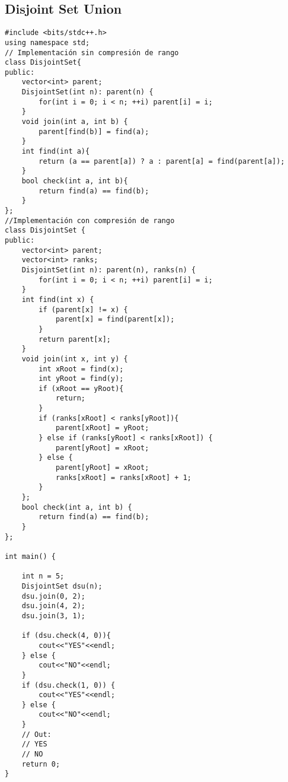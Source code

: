 \documentclass[10pt,letterpaper,twocolumn,twosided]{article}
\begin{document}
\subsection{Disjoint Set Union}
\begin{lstlisting}
#include <bits/stdc++.h>
using namespace std;
// Implementación sin compresión de rango
class DisjointSet{
public:
    vector<int> parent;
    DisjointSet(int n): parent(n) {
        for(int i = 0; i < n; ++i) parent[i] = i;
    }
    void join(int a, int b) {
        parent[find(b)] = find(a);
    }
    int find(int a){
        return (a == parent[a]) ? a : parent[a] = find(parent[a]); 
    }
    bool check(int a, int b){
        return find(a) == find(b);
    }
};
//Implementación con compresión de rango
class DisjointSet {
public:
    vector<int> parent;
    vector<int> ranks;
    DisjointSet(int n): parent(n), ranks(n) {
        for(int i = 0; i < n; ++i) parent[i] = i;
    }
    int find(int x) { 
        if (parent[x] != x) { 
            parent[x] = find(parent[x]); 
        } 
        return parent[x]; 
    }
    void join(int x, int y) { 
        int xRoot = find(x);
        int yRoot = find(y); 
        if (xRoot == yRoot){ 
            return; 
        }
        if (ranks[xRoot] < ranks[yRoot]){ 
            parent[xRoot] = yRoot; 
        } else if (ranks[yRoot] < ranks[xRoot]) {
            parent[yRoot] = xRoot; 
        } else { 
            parent[yRoot] = xRoot; 
            ranks[xRoot] = ranks[xRoot] + 1; 
        } 
    };
    bool check(int a, int b) {
        return find(a) == find(b);
    }
};

int main() {

    int n = 5;
    DisjointSet dsu(n);
    dsu.join(0, 2); 
    dsu.join(4, 2); 
    dsu.join(3, 1); 
    
    if (dsu.check(4, 0)){
        cout<<"YES"<<endl;
    } else {
        cout<<"NO"<<endl;
    } 
    if (dsu.check(1, 0)) {
        cout<<"YES"<<endl;
    } else {
        cout<<"NO"<<endl;
    }
    // Out:
    // YES
    // NO
    return 0;
}
\end{lstlisting}
\end{document}
